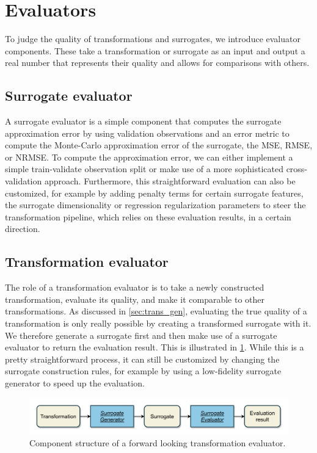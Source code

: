 \documentclass[
  a4paper,  %
  twoside,  %
  bibliography=totoc,
  headsepline,
  cleardoublepage=empty,
  parskip=half,
  draft=false
]{scrbook}
\begin{document}
\section {Evaluators}

To judge the quality of transformations and surrogates, we introduce evaluator components.
These take a transformation or surrogate as an input and output a real number that represents their quality and allows for comparisons with others.

\subsection {Surrogate evaluator}
\label{sec:se}

A surrogate evaluator is a simple component that computes the surrogate approximation error by using validation observations and an error metric to compute the Monte-Carlo approximation error of the surrogate, \eg the MSE, RMSE, or NRMSE.
To compute the approximation error, we can either implement a simple train-validate observation split or make use of a more sophisticated cross-validation approach.
Furthermore, this straightforward evaluation can also be customized, for example by adding penalty terms for certain surrogate features, \eg the surrogate dimensionality or regression regularization parameters to steer the transformation pipeline, which relies on these evaluation results, in a certain direction.

\newpage
\subsection {Transformation evaluator}
\label{sec:te}

The role of a transformation evaluator is to take a newly constructed transformation, evaluate its quality, and make it comparable to other transformations.
As discussed in \cref{sec:trans_gen}, evaluating the true quality of a transformation is only really possible by creating a transformed surrogate with it.
We therefore generate a surrogate first and then make use of a surrogate evaluator to return the evaluation result.
This is illustrated in \cref{fig:te}.
While this is a pretty straightforward process, it can still be customized by changing the surrogate construction rules, for example by using a low-fidelity surrogate generator to speed up the evaluation.

\begin{mdframed}[style=style,frametitle={Transformation evaluator (forward looking)}]
\begin{figure}[H]
\includegraphics[width=\textwidth]{graphics/TransformationEval.pdf}
\delimit
\caption{Component structure of a forward looking transformation evaluator.}
\label{fig:te}
\end{figure}
\end{mdframed}
\end{document}
